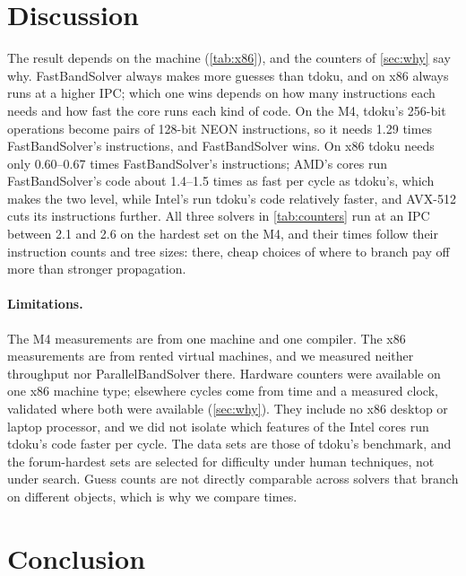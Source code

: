 \documentclass[11pt]{article}
\theoremstyle{definition}
\theoremstyle{plain}
\begin{document}
\section{Discussion}

The result depends on the machine (\cref{tab:x86}), and the counters of \cref{sec:why} say why. FastBandSolver
always makes more guesses than tdoku, and on x86 always runs at a higher IPC; which one wins depends on how many
instructions each needs and how fast the core runs each kind of code. On the M4, tdoku's 256-bit operations become
pairs of 128-bit NEON instructions, so it needs 1.29 times FastBandSolver's instructions, and FastBandSolver wins. On
x86 tdoku needs only 0.60--0.67 times FastBandSolver's instructions; AMD's cores run FastBandSolver's code about 1.4--1.5
times as fast per cycle as tdoku's, which makes the two level, while Intel's run tdoku's code relatively faster, and
AVX-512 cuts its instructions further. All three solvers in \cref{tab:counters} run at an IPC between 2.1 and 2.6 on
the hardest set on the M4, and their times follow their instruction counts and tree sizes: there, cheap choices of where to branch pay
off more than stronger propagation.

\paragraph{Limitations.} The M4 measurements are from one machine and one compiler. The x86 measurements are from
rented virtual machines, and we measured neither throughput nor ParallelBandSolver there. Hardware counters were
available on one x86 machine type; elsewhere cycles come from time and a measured clock, validated where both were
available (\cref{sec:why}). They include no x86 desktop or laptop processor, and we did not isolate which features
of the Intel cores run tdoku's code faster per cycle. The data sets are those of tdoku's benchmark, and the
forum-hardest sets are selected for difficulty under human techniques, not under search. Guess counts are not directly
comparable across solvers that branch on different objects, which is why we compare times.

\section{Conclusion}
\end{document}

